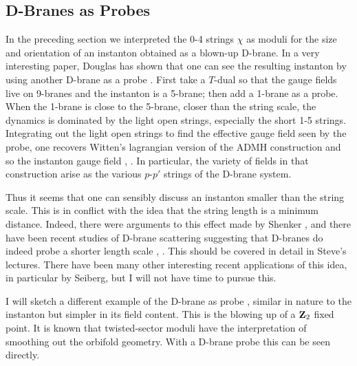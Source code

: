 \documentclass[12pt]{article}
\def\Z{{\bf Z}}
\begin{document}
\subsection{D-Branes as Probes}

In the preceding section we interpreted the 0-4 strings $\chi$ as moduli for the
size and orientation of an instanton obtained as a blown-up D-brane.  In a very
interesting paper, Douglas has shown that one can see the resulting instanton by
using another D-brane as a probe \cite{dougprobe}.  First take a $T$-dual so that
the gauge fields live on 9-branes and the instanton is a 5-brane; then add a
1-brane as a probe.  When the 1-brane is close to the 5-brane, closer than the
string scale, the dynamics is dominated by the light open strings, especially
the short 1-5 strings.  Integrating out the light open strings to find the
effective gauge field seen by the probe, one recovers Witten's lagrangian
version of the ADMH construction and so the
instanton gauge field \cite{witadmh}, \cite{admh}.  In particular, the
variety of fields in that construction arise as the various
$p$-$p'$ strings of the D-brane system.

Thus it seems that one can sensibly discuss an instanton smaller than the
string scale.  This is in conflict with the idea that the
string length is a minimum distance.  Indeed, there were arguments to this
effect made by Shenker \cite{shenk2}, and there have been recent studies of
D-brane scattering suggesting that D-branes do indeed probe a shorter length
scale \cite{bachas}, \cite{short}. This should be covered in detail in
Steve's lectures.  There have been many other interesting recent applications of
this idea, in particular by Seiberg, but I will not have time to pursue this.

I will sketch a different example of the D-brane as probe \cite{tensors},
similar in nature to the instanton but simpler in its field content.  This is
the blowing up of a $\Z_2$ fixed point.  It is known that twisted-sector moduli
have the interpretation of smoothing out the orbifold geometry.  With a D-brane
probe this can be seen directly.
\end{document}
